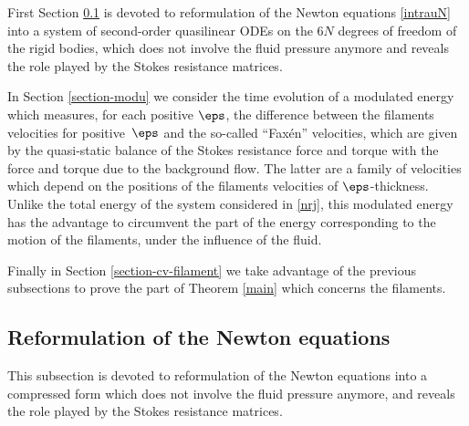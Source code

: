 First Section \ref{refor} is devoted to reformulation of the Newton equations \eqref{intrauN} into
a system of second-order quasilinear ODEs on the $6N$ degrees of freedom of the rigid bodies, which does not involve the fluid pressure anymore and reveals the role played by the Stokes resistance matrices.

In Section \ref{section-modu} we consider the time evolution of a modulated energy which measures, for each positive $\eps$, the difference between the filaments velocities for positive~$\eps$ and the so-called ``Faxén'' velocities, which are given by the quasi-static balance of the Stokes resistance force and torque
with the force and torque due to the background flow. The latter are a family
of velocities which depend on the positions of the filaments velocities of $\eps$-thickness.
Unlike the total energy of the system considered in \eqref{nrj}, this modulated energy has the advantage to circumvent the part of the energy corresponding to the motion of the filaments, under the influence of the fluid.

Finally in Section \ref{section-cv-filament} we take advantage of the previous subsections to prove the part of
Theorem \ref{main} which concerns the filaments.

\subsection{Reformulation of the Newton equations}
\label{refor}

This subsection is devoted to reformulation of the Newton equations into a compressed form which does not involve the fluid pressure anymore, and reveals the role played by the Stokes resistance matrices.

